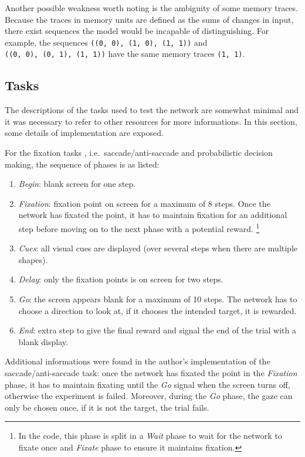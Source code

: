 \documentclass[10pt,a4paper,onecolumn]{article}
\newcommand{\tightlist}{%
  \setlength{\itemsep}{1pt}\setlength{\parskip}{0pt}\setlength{\parsep}{0pt}}
\begin{document}
Another possible weakness worth noting is the ambiguity of some memory
traces. Because the traces in memory units are defined as the sums of
changes in input, there exist sequences the model would be incapable of
distinguishing. For example, the sequences
\texttt{((0,\ 0),\ (1,\ 0),\ (1,\ 1))} and
\texttt{((0,\ 0),\ (0,\ 1),\ (1,\ 1))} have the same memory traces
\texttt{(1,\ 1)}.

\subsection{Tasks}\label{tasks}

The descriptions of the tasks used to test the network are somewhat
minimal and it was necessary to refer to other resources for more
informations. In this section, some details of implementation are
exposed.

For the fixation tasks , i.e.~saccade/anti-saccade and probabilistic
decision making, the sequence of phases is as listed:

\begin{enumerate}
\def\labelenumi{\arabic{enumi}.}
\tightlist
\item
  \emph{Begin}: blank screen for one step.
\item
  \emph{Fixation}: fixation point on screen for a maximum of 8 steps.
  Once the network has fixated the point, it has to maintain fixation
  for an additional step before moving on to the next phase with a
  potential reward. \footnote{In the code, this phase is split in a
    \emph{Wait} phase to wait for the network to fixate once and
    \emph{Fixate} phase to ensure it maintains fixation.}
\item
  \emph{Cues}: all visual cues are displayed (over several steps when
  there are multiple shapes).
\item
  \emph{Delay}: only the fixation points is on screen for two steps.
\item
  \emph{Go}: the screen appears blank for a maximum of 10 steps. The
  network has to choose a direction to look at, if it chooses the
  intended target, it is rewarded.
\item
  \emph{End}: extra step to give the final reward and signal the end of
  the trial with a blank display.
\end{enumerate}

Additional informations were found in the author's implementation of the
saccade/anti-saccade task: once the network has fixated the point in the
\emph{Fixation} phase, it has to maintain fixating until the \emph{Go}
signal when the screen turns off, otherwise the experiment is failed.
Moreover, during the \emph{Go} phase, the gaze can only be chosen once,
if it is not the target, the trial fails.
\end{document}

